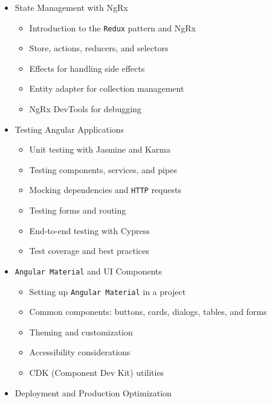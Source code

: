 \documentclass[
]{article}
\providecommand{\tightlist}{%
  \setlength{\itemsep}{0pt}\setlength{\parskip}{0pt}}
\begin{document}
\begin{itemize}
  \begin{itemize}
  \tightlist
  \item
    Introduction to observables and the observer pattern
  \item
    Core \texttt{RxJS} operators: map, filter, switchMap, mergeMap,
    concatMap
  \item
    Subjects and multicasting
  \item
    Combining observables: combineLatest, forkJoin, \texttt{zip}
  \item
    Error handling with catchError and retry
  \item
    Unsubscribing and memory leak prevention
  \end{itemize}
\item
  State Management with NgRx

  \begin{itemize}
  \tightlist
  \item
    Introduction to the \texttt{Redux} pattern and NgRx
  \item
    Store, actions, reducers, and selectors
  \item
    Effects for handling side effects
  \item
    Entity adapter for collection management
  \item
    NgRx DevTools for debugging
  \end{itemize}
\item
  Testing Angular Applications

  \begin{itemize}
  \tightlist
  \item
    Unit testing with Jasmine and Karma
  \item
    Testing components, services, and pipes
  \item
    Mocking dependencies and \texttt{HTTP} requests
  \item
    Testing forms and routing
  \item
    End-to-end testing with Cypress
  \item
    Test coverage and best practices
  \end{itemize}
\item
  \texttt{Angular\ Material} and UI Components

  \begin{itemize}
  \tightlist
  \item
    Setting up \texttt{Angular\ Material} in a project
  \item
    Common components: buttons, cards, dialogs, tables, and forms
  \item
    Theming and customization
  \item
    Accessibility considerations
  \item
    CDK (Component Dev Kit) utilities
  \end{itemize}
\item
  Deployment and Production Optimization


\end{itemize}
\end{document}
